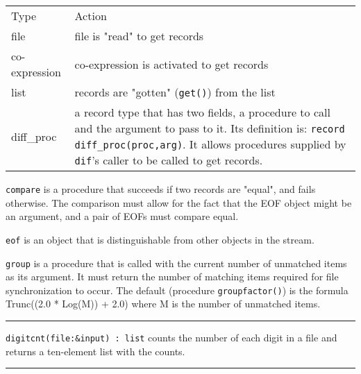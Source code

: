 \begin{supertabular}{m{1.0in} m{4.8in}}
Type & Action \\

file &  file is "read" to get records\\
co-expression & co-expression is activated to get records\\
list & records are "gotten"
(\texttt{get()}) from the list\\
diff\_proc & a record type that has two fields, a procedure
to call and the argument to pass to it. Its definition is:
 \texttt{record diff\_proc(proc,arg)}. It allows
procedures supplied by \texttt{dif}'s
 caller to be called to get records.
\\
\end{supertabular}

\texttt{compare} is a procedure that succeeds if two records are
"equal", and fails otherwise. The
comparison must allow for the fact that the EOF object might be an
argument, and a pair of EOFs must compare equal.

\texttt{eof} is an object that is distinguishable from other objects in
the stream.

\texttt{group} is a procedure that is called with the current number of
unmatched items as its argument. It must return the number of matching
items required for file synchronization to occur. The default
(procedure \texttt{groupfactor()}) is the formula Trunc((2.0 * Log(M))
+ 2.0) where M is the number of unmatched items.

\vspace{0.25cm}\hrule{}

\texttt{digitcnt(file:\&input) : list} counts the number of each digit
in a file and returns a ten-element list with the counts. 



\vspace{0.25cm}\hrule{}

